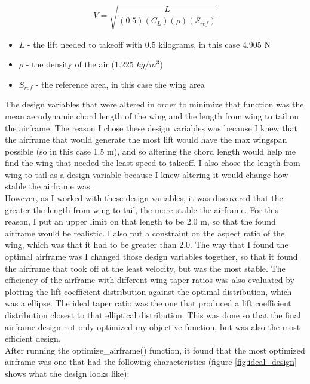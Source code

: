 \documentclass{journal}
\providecommand{\DIFaddbegin}{} %
\providecommand{\DIFaddend}{} %
\newcommand{\DIFaddincludegraphics}[2][]{{\color{blue}\fbox{\DIFOincludegraphics[#1]{#2}}}} %
\DeclareRobustCommand{\DIFaddbegin}{\DIFOaddbegin \let\includegraphics\DIFaddincludegraphics} %
\DeclareRobustCommand{\DIFaddend}{\DIFOaddend \let\includegraphics\DIFOincludegraphics} %
\begin{document}
	\begin{equation}
		V = \sqrt{\frac{L}{(0.5)(C_L)(\rho)(S_{ref})}}
		\label{eqn:needed-velocity}
	\end{equation}

	\begin{itemize}
		\item \(L\) - the lift needed to takeoff with 0.5 kilograms, in this case 4.905 N
		\item \(\rho\) - the density of the air (1.225 \(kg/m^3\))
		\item \(S_{ref}\) - the reference area, in this case the wing area
	\end{itemize}

	The design variables that were altered in order to minimize that function was the mean aerodynamic chord length of the wing and the length from wing to tail on the airframe. The reason I chose these design variables was because I knew that the airframe that would generate the most lift would have the max wingspan possible (so in this case 1.5 m), and so altering the chord length would help me find the wing that needed the least speed to takeoff. I also chose the length from wing to tail as a design variable because I knew altering it would change how stable the airframe was.\DIFaddbegin \\

	\DIFaddend However, as I worked with these design variables, it was discovered that the greater the length from wing to tail, the more stable the airframe. For this reason, I put an upper limit on that length to be 2.0 m, so that the found airframe would be realistic. I also put a constraint on the aspect ratio of the wing, which was that it had to be greater than 2.0. The way that I found the optimal airframe was I changed those design variables together, so that it found the airframe that took off at the least velocity, but was the most stable. The efficiency of the airframe with different wing taper ratios was also evaluated by plotting the lift coefficient distribution against the optimal distribution, which was a ellipse. The ideal taper ratio was the one that produced a lift coefficient distribution closest to that elliptical distribution. This was done so that the final airframe design not only optimized my objective function, but was also the most efficient design.\\

	After running the optimize\_airframe() function, it found that the most optimized airframe was one that had the following characteristics (figure \ref{fig:ideal_design} shows what the design looks like):
\end{document}
